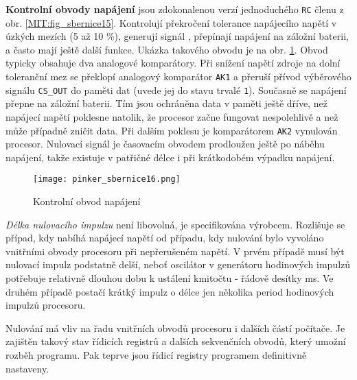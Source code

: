       \textbf{Kontrolní obvody napájení} jsou zdokonalenou verzí jednoduchého \texttt{RC} členu z 
      obr. \ref{MIT:fig_sbernice15}. Kontrolují překročení tolerance napájecího napětí v úzkých 
      mezích (5 až 10 \%), generují signál \texttt{}, přepínají napájení na 
      záložní baterii, a často mají ještě další funkce. Ukázka takového obvodu je na obr. 
      \ref{MIT:fig_sbernice16}. Obvod typicky obsahuje dva analogové komparátory. Při snížení 
      napětí zdroje na dolní toleranční mez se překlopí analogový  komparátor \texttt{AK1} a 
      přeruší přívod výběrového signálu \texttt{CS\_OUT} do paměti dat (uvede jej do stavu trvalé 
      \texttt{1}). Současně se napájení přepne na záložní baterii. Tím jsou ochráněna data v 
      paměti ještě dříve, než napájecí napětí poklesne natolik, že procesor začne fungovat 
      nespolehlivě a než může případně zničit data. Při dalším poklesu je komparátorem \texttt{AK2} 
      vynulován procesor. Nulovací signál je časovacím obvodem prodloužen ještě po náběhu napájení, 
      takže existuje v patřičné délce i při krátkodobém výpadku napájení.

      \begin{figure}[ht!] %
        \centering
        \texttt{[image: pinker\_sbernice16.png]}
        \caption{Kontrolní obvod napájení}
        \label{MIT:fig_sbernice16}
      \end{figure}
      
      \emph{Délka nulovacího impulzu} není libovolná, je specifikována výrobcem. Rozlišuje se 
      případ, kdy nabíhá napájecí napětí od případu, kdy nulování bylo vyvoláno vnitřními obvody 
      procesoru při nepřerušeném napětí. V prvém případě musí být nulovací impulz podstatně delší, 
      neboť oscilátor v generátoru hodinových impulzů potřebuje relativně dlouhou dobu k ustálení 
      kmitočtu - řádově desítky ms. Ve druhém případě postačí krátký impulz o délce jen několika 
      period hodinových impulzů procesoru.
      
      Nulování má vliv na řadu vnitřních obvodů procesoru i dalších částí počítače. Je zajištěn 
      takový stav řídicích registrů a dalších sekvenčních obvodů, který umožní rozběh programu. Pak 
      teprve jsou řídicí registry programem definitivně nastaveny.
      
